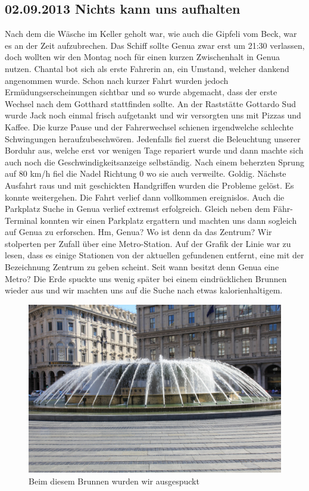 \subsection{02.09.2013 Nichts kann uns aufhalten} 
Nach dem die Wäsche im Keller geholt war, wie auch die Gipfeli vom Beck, war es an der Zeit aufzubrechen.
Das Schiff sollte Genua zwar erst um 21:30 verlassen, doch wollten wir den Montag noch für einen kurzen Zwischenhalt in Genua nutzen.
Chantal bot sich als erste Fahrerin an, ein Umstand, welcher dankend angenommen wurde.
Schon nach kurzer Fahrt wurden jedoch Ermüdungserscheinungen sichtbar und so wurde abgemacht, dass der erste Wechsel nach dem Gotthard stattfinden sollte.
An der Raststätte Gottardo Sud wurde Jack noch einmal frisch aufgetankt und wir versorgten uns mit Pizzas und Kaffee.
Die kurze Pause und der Fahrerwechsel schienen irgendwelche schlechte Schwingungen heraufzubeschwören.
Jedenfalls fiel zuerst die Beleuchtung unserer Borduhr aus, welche erst vor wenigen Tage repariert wurde und dann machte sich auch noch die Geschwindigkeitsanzeige selbständig.
Nach einem beherzten Sprung auf 80 km/h fiel die Nadel Richtung 0 wo sie auch verweilte.
Goldig.
Nächste Ausfahrt raus und mit geschickten Handgriffen wurden die Probleme gelöst.
Es konnte weitergehen.
Die Fahrt verlief dann vollkommen ereignislos.
Auch die Parkplatz Suche in Genua verlief extremst erfolgreich.
Gleich neben dem Fähr- Terminal konnten wir einen Parkplatz ergattern und machten uns dann sogleich auf Genua zu erforschen.
Hm, Genua? Wo ist denn da das Zentrum? Wir stolperten per Zufall über eine Metro-Station.
Auf der Grafik der Linie war zu lesen, dass es einige Stationen von der aktuellen gefundenen entfernt, eine mit der Bezeichnung Zentrum zu geben scheint.
Seit wann besitzt denn Genua eine Metro? Die Erde spuckte uns wenig später bei einem eindrücklichen Brunnen wieder aus und wir machten uns auf die Suche nach etwas kalorienhaltigem.

\begin{figure}[h]
    \centering
    \includegraphics[width=\textwidth]{../Bilder/Sardinien/1.jpg}
    \caption{Beim diesem Brunnen wurden wir ausgespuckt}
    \label{img:Brunnen in Genua}
\end{figure}

